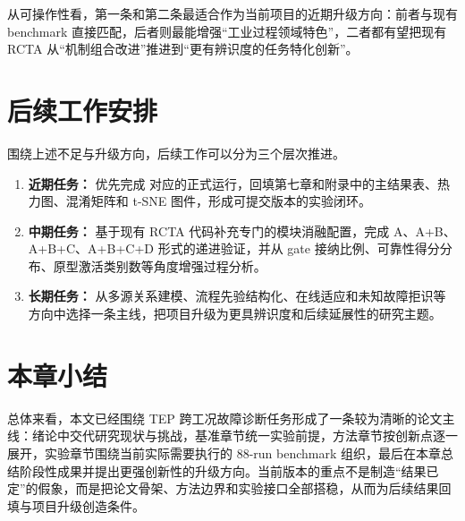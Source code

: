 从可操作性看，第一条和第二条最适合作为当前项目的近期升级方向：前者与现有 benchmark 直接匹配，后者则最能增强“工业过程领域特色”，二者都有望把现有 RCTA 从“机制组合改进”推进到“更有辨识度的任务特化创新”。

\section{后续工作安排}
围绕上述不足与升级方向，后续工作可以分为三个层次推进。

\begin{enumerate}
\item \textbf{近期任务：} 优先完成
对应的正式运行，回填第七章和附录中的主结果表、热力图、混淆矩阵和 t-SNE 图件，形成可提交版本的实验闭环。
\item \textbf{中期任务：} 基于现有 RCTA 代码补充专门的模块消融配置，完成 A、A+B、A+B+C、A+B+C+D 形式的递进验证，并从 gate 接纳比例、可靠性得分分布、原型激活类别数等角度增强过程分析。
\item \textbf{长期任务：} 从多源关系建模、流程先验结构化、在线适应和未知故障拒识等方向中选择一条主线，把项目升级为更具辨识度和后续延展性的研究主题。
\end{enumerate}

\section{本章小结}
总体来看，本文已经围绕 TEP 跨工况故障诊断任务形成了一条较为清晰的论文主线：绪论中交代研究现状与挑战，基准章节统一实验前提，方法章节按创新点逐一展开，实验章节围绕当前实际需要执行的 88-run benchmark 组织，最后在本章总结阶段性成果并提出更强创新性的升级方向。当前版本的重点不是制造“结果已定”的假象，而是把论文骨架、方法边界和实验接口全部搭稳，从而为后续结果回填与项目升级创造条件。
